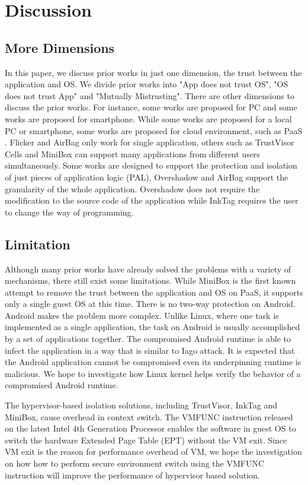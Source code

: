 \section{Discussion}
\label{sec:discussion}

\subsection{More Dimensions} 

In this paper, we discuss prior works in just one dimension, the trust between
the application and OS. We divide prior works into "App does not trust OS", "OS
does not trust App" and "Mutually Mistrusting". There are other dimensions to
discuss the prior works. For instance, some works \cite{Flicker, TrustVisor,
Overshadow, InkTag, VirtualGhost, CloudTerminal, SFI, PittSFIeld, NaCl, Krude,
MiniBox} are proposed for PC and some works \cite{TLR, VeriUI, TrustUI,
TrustDroid, Cells, AirBag} are proposed for smartphone. While some works are
proposed for a local PC or smartphone, some works are proposed for cloud
environment, such as PaaS \cite{Krude, MiniBox}. Flicker and AirBag only work
for single application, others such as TrustVisor Cells and MiniBox can support
many applications from different users simultaneously. Some works are designed
to support the protection and isolation of just pieces of application logic
(PAL), Overshadow and AirBag support the granularity of the whole application.
Overshadow does not require the modification to the source code of the
application while InkTag requires the user to change the way of programming.

\subsection{Limitation}

Although many prior works have already solved the problems with a variety of
mechanisms, there still exist some limitations. While MiniBox \cite{MiniBox} is
the first known attempt to remove the trust between the application and OS on
PaaS, it supports only a single guest OS at this time. There is no two-way
protection on Android. Android makes the problem more complex. Unlike Linux,
where one task is implemented as a single application, the task on Android is
usually accomplished by a set of applications together. The compromised Android
runtime is able to infect the application in a way that is similar to Iago
attack. It is expected that the Android application cannot be compromised even
its underpinning runtime is malicious. We hope to investigate how Linux kernel
helps verify the behavior of a compromised Android runtime.

The hypervisor-based isolation solutions, including TrustVisor, InkTag and
MiniBox, cause overhead in context switch. The VMFUNC instruction released on
the latest Intel 4th Generation Processor enables the software in guest OS to
switch the hardware Extended Page Table (EPT) without the VM exit. Since VM exit
is the reason for performance overhead of VM, we hope the investigation on how
how to perform secure environment switch using the VMFUNC instruction will
improve the performance of hypervisor based solution.
